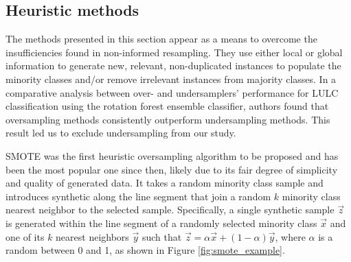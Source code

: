 \documentclass[remotesensing,article,submit,moreauthors,pdftex]{Definitions/mdpi}
\begin{document}
\begin{paracol}{2}
\subsection{Heuristic methods}

The methods presented in this section appear as a means to overcome the
insufficiencies found in non-informed resampling. They use either local or
global information to generate new, relevant, non-duplicated instances to
populate the minority classes and/or remove irrelevant instances from majority
classes. In a comparative analysis between over- and undersamplers' performance
for LULC classification \cite{Feng2018} using the rotation forest ensemble
classifier, authors found that oversampling methods consistently outperform
undersampling methods. This result led us to exclude undersampling from our
study.

SMOTE \cite{Chawla2002} was the first heuristic oversampling algorithm to be
proposed and has been the most popular one since then, likely due to its fair
degree of simplicity and quality of generated data. It takes a random minority
class sample and introduces synthetic  along
the line segment that join a random $k$ minority class nearest neighbor to the
selected sample. Specifically, a single synthetic sample $\overrightarrow{z}$
is generated within the line segment of a randomly selected minority
class $\overrightarrow{x}$ and one of its
$k$ nearest neighbors $\overrightarrow{y}$ such that $\overrightarrow{z} =
\alpha\overrightarrow{x}+(1-\alpha)\overrightarrow{y}$, where $\alpha$ is a
random  between 0 and 1, as shown in
Figure \ref{fig:smote_example}.

\end{paracol}
\end{document}
